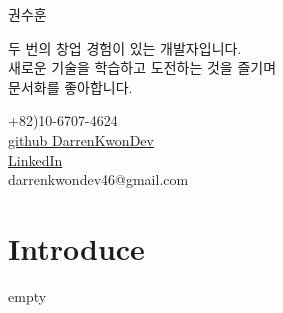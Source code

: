 \documentclass[letterpaper,12pt]{article}
\begin{document}
\begin{center}
    {\LARGE 권수훈} \\ \vspace{20pt}
    \begin{multicols}{2}
    \begin{flushleft}
    \small{두 번의 창업 경험이 있는 개발자입니다.} \\
    \small{새로운 기술을 학습하고 도전하는 것을 즐기며} \\ 
    \small{문서화를 좋아합니다.} \\ 
    \end{flushleft}
    
    \begin{flushright}
    \small{+82)10-6707-4624} \\
    \href{https://github.com/DarrenKwonDev
    }{github DarrenKwonDev} \\
    \href{https://www.linkedin.com/in/kwon-darren-b94a8a214/
    }{LinkedIn} \\
    \href{mailto:{darrenkwondev46@gmail.com}} \large{darrenkwondev46@gmail.com}
    \end{flushright}
    \end{multicols}
\end{center}


\section{Introduce}
\small{empty} \\


\end{document}
